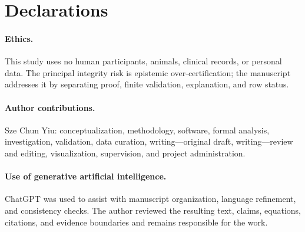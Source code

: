 \section{Declarations}

\paragraph{Ethics.} This study uses no human participants, animals, clinical records, or personal data. The principal integrity risk is epistemic over-certification; the manuscript addresses it by separating proof, finite validation, explanation, and row status.

\paragraph{Author contributions.} Sze Chun Yiu: conceptualization, methodology, software, formal analysis, investigation, validation, data curation, writing---original draft, writing---review and editing, visualization, supervision, and project administration.

\paragraph{Use of generative artificial intelligence.} ChatGPT was used to assist with manuscript organization, language refinement, and consistency checks. The author reviewed the resulting text, claims, equations, citations, and evidence boundaries and remains responsible for the work.
